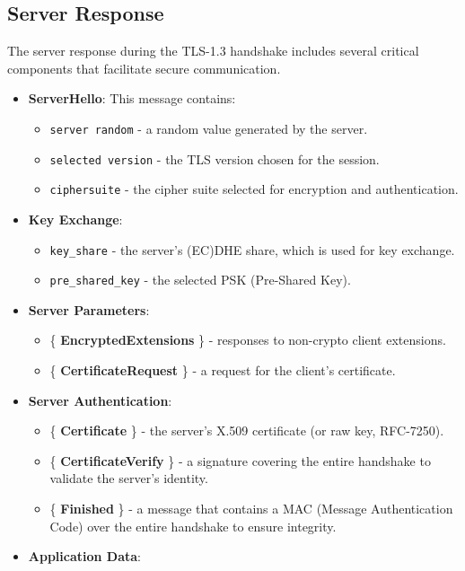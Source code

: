 \subsection{Server Response} %

The server response during the TLS-1.3 handshake includes several critical components that facilitate secure communication. 

\begin{itemize}
    \item \textbf{ServerHello}: This message contains:
    \begin{itemize}
        \item \texttt{server random} - a random value generated by the server.
        \item \texttt{selected version} - the TLS version chosen for the session.
        \item \texttt{ciphersuite} - the cipher suite selected for encryption and authentication.
    \end{itemize}

    \item \textbf{Key Exchange}:
    \begin{itemize}
        \item \texttt{key\_share} - the server's (EC)DHE share, which is used for key exchange.
        \item \texttt{pre\_shared\_key} - the selected PSK (Pre-Shared Key).
    \end{itemize}

    \item \textbf{Server Parameters}:
    \begin{itemize}
        \item \{ \textbf{EncryptedExtensions} \} - responses to non-crypto client extensions.
        \item \{ \textbf{CertificateRequest} \} - a request for the client's certificate.
    \end{itemize}

    \item \textbf{Server Authentication}:
    \begin{itemize}
        \item \{ \textbf{Certificate} \} - the server's X.509 certificate (or raw key, RFC-7250).
        \item \{ \textbf{CertificateVerify} \} - a signature covering the entire handshake to validate the server's identity.
        \item \{ \textbf{Finished} \} - a message that contains a MAC (Message Authentication Code) over the entire handshake to ensure integrity.
    \end{itemize}
    
    \item \textbf{Application Data}:
\end{itemize}

